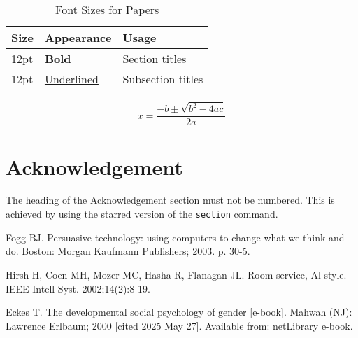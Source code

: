 \documentclass[a4paper,12pt,twocolumn]{article}
\begin{document}
\begin{table}[h!]
    \caption{Font Sizes for Papers}
    \label{tab:fonts}
    \centering
    \fontsize{10}{12}\selectfont
    \begin{tabular}{|l|l|l|}
        \hline
        \textbf{Size} & \textbf{Appearance} & \textbf{Usage} \\
        \hline
        12pt & \textbf{Bold} & Section titles \\
        12pt & \mbox{\ul{Underlined}} & Subsection titles \\
        \hline
    \end{tabular}
\end{table}

\begin{equation}
    x = \frac{-b \pm \sqrt{b^2 - 4ac}}{2a}
    \label{eq:quadratic}
\end{equation}

\lipsum[3-4]

\section*{Acknowledgement}
The heading of the Acknowledgement section must not be numbered. This is achieved by using the starred version of the \texttt{section} command.

\begin{thebibliography}{99}
Fogg BJ. Persuasive technology: using computers to change what we think and do. Boston: Morgan Kaufmann Publishers; 2003. p. 30-5.

Hirsh H, Coen MH, Mozer MC, Hasha R, Flanagan JL. Room service, Al-style. IEEE Intell Syst. 2002;14(2):8-19.

Eckes T. The developmental social psychology of gender [e-book]. Mahwah (NJ): Lawrence Erlbaum; 2000 [cited 2025 May 27]. Available from: netLibrary e-book.
\end{thebibliography}
\end{document}
